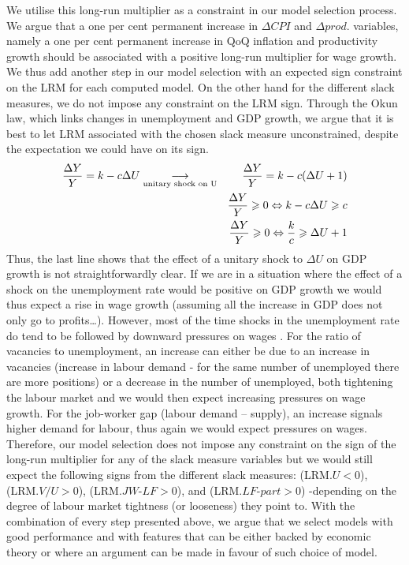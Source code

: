 We utilise this long-run multiplier as a constraint in our model selection process.
We argue that a one per cent permanent increase in $\Delta CPI$ and $\Delta prod.$ variables, namely a one per cent permanent increase in QoQ inflation and productivity growth should be associated with a positive long-run multiplier for wage growth. 
We thus add another step in our model selection with an expected sign constraint on the LRM for each computed model. 
On the other hand for the different slack measures, we do not impose any constraint on the LRM sign. 
Through the Okun law, which links changes in unemployment and GDP growth, we argue that it is best to let LRM associated with the chosen slack measure unconstrained, despite the expectation we could have on its sign.
\vspace{-0.0005cm}
\begin{align*}
    \frac{\Delta Y}{Y} = k - c\Delta U \underset{\textrm{unitary shock on U}}{\longrightarrow} \hspace*{0.7cm} \frac{\Delta Y}{Y} = k - c(\Delta U + 1)\\
    \frac{\Delta Y}{Y} \geqslant 0 \Leftrightarrow k - c\Delta U \geqslant c\\
    \frac{\Delta Y}{Y} \geqslant 0 \Leftrightarrow \frac{k}{c} \geqslant \Delta U +1\\
\end{align*}
Thus, the last line shows that the effect of a unitary shock to $\Delta U$ on GDP growth is not straightforwardly clear. 
If we are in a situation where the effect of a shock on the unemployment rate would be positive on GDP growth we would thus expect a rise in wage growth (assuming all the increase in GDP does not only go to profits…). 
However, most of the time shocks in the unemployment rate do tend to be followed by downward pressures on wages . 
For the ratio of vacancies to unemployment, an increase can either be due to an increase in vacancies (increase in labour demand - for the same number of unemployed there are more positions) or a decrease in the number of unemployed, both tightening the labour market and we would then expect increasing pressures on wage growth. 
For the job-worker gap (labour demand – supply), an increase signals higher demand for labour, thus again we would expect pressures on wages. 
Therefore, our model selection does not impose any constraint on the sign of the long-run multiplier for any of the slack measure variables but we would still expect the following signs from the different slack measures: (LRM.$U<0$), (LRM.$V/U>0$), (LRM.$JW\textrm{-}LF>0$), and (LRM.$LF\textrm{-}part>0$) -depending on the degree of labour market tightness (or looseness) they point to. 
With the combination of every step presented above, we argue that we select models with good performance and with features that can be either backed by economic theory or where an argument can be made in favour of such choice of model.

